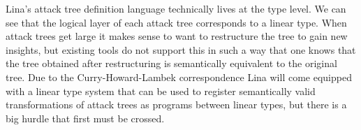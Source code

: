 Lina's attack tree definition language technically lives at the type
level.  We can see that the logical layer of each attack tree
corresponds to a linear type.  When attack trees get large it makes
sense to want to restructure the tree to gain new insights, but
existing tools do not support this in such a way that one knows that
the tree obtained after restructuring is semantically equivalent to
the original tree.  Due to the Curry-Howard-Lambek correspondence Lina
will come equipped with a linear type system that can be used to
register semantically valid transformations of attack trees as
programs between linear types, but there is a big hurdle that first
must be crossed.
